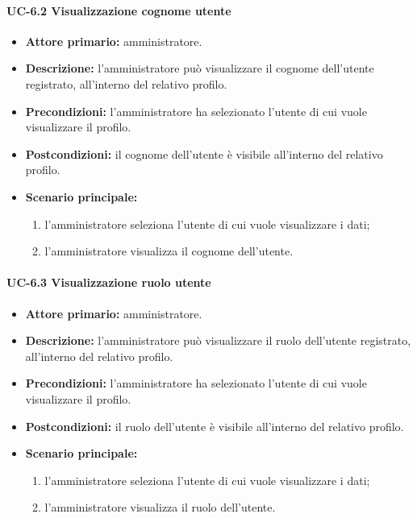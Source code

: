     \paragraph{UC-6.2 Visualizzazione cognome utente}
    \begin{itemize}
        \item \textbf{Attore primario:} amministratore.
        
        \item \textbf{Descrizione:} l'amministratore può visualizzare il cognome dell'utente registrato, all'interno del relativo profilo.
        
        \item \textbf{Precondizioni:} l'amministratore ha selezionato l'utente di cui vuole visualizzare il profilo.
    
        \item \textbf{Postcondizioni:} il cognome dell'utente è visibile all'interno del relativo profilo.
    
        \item \textbf{Scenario principale:}
        \begin{enumerate}
            \item  l'amministratore seleziona l'utente di cui vuole visualizzare i dati;
            \item  l'amministratore visualizza il cognome dell'utente.
        \end{enumerate}
    \end{itemize}

    \paragraph{UC-6.3 Visualizzazione ruolo utente}
    \begin{itemize}
        \item \textbf{Attore primario:} amministratore.
        
        \item \textbf{Descrizione:} l'amministratore può visualizzare il ruolo dell'utente registrato, all'interno del relativo profilo.
        
        \item \textbf{Precondizioni:} l'amministratore ha selezionato l'utente di cui vuole visualizzare il profilo.
    
        \item \textbf{Postcondizioni:} il ruolo dell'utente è visibile all'interno del relativo profilo.
    
        \item \textbf{Scenario principale:}
        \begin{enumerate}
            \item  l'amministratore seleziona l'utente di cui vuole visualizzare i dati;
            \item  l'amministratore visualizza il ruolo dell'utente.
        \end{enumerate}
    \end{itemize}

